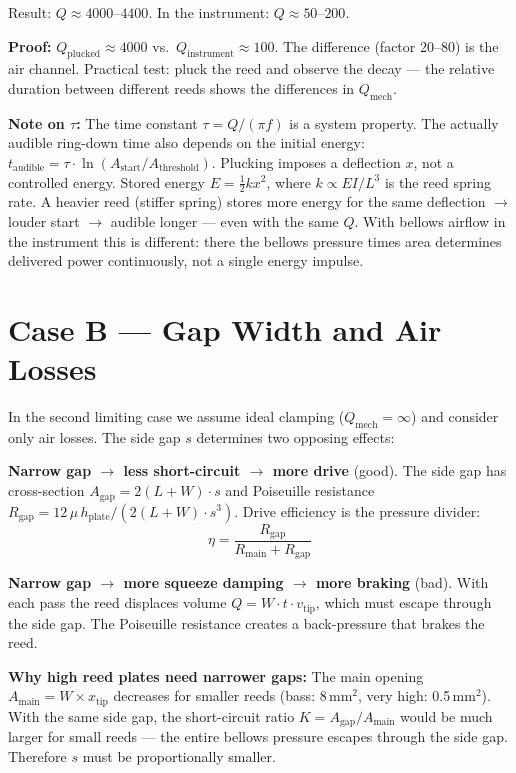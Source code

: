 \documentclass[11pt,a4paper]{article}
\begin{document}
Result: $Q \approx 4000$--$4400$. In the instrument: $Q \approx 50$--$200$.

\begin{keybox}
\textbf{Proof:} $Q_\text{plucked} \approx 4000$ vs.\ $Q_\text{instrument} \approx 100$. The difference (factor 20--80) is the air channel. Practical test: pluck the reed and observe the decay --- the relative duration between different reeds shows the differences in $Q_\text{mech}$.
\end{keybox}

\textbf{Note on $\tau$:} The time constant $\tau = Q/(\pi f)$ is a system property. The actually audible ring-down time also depends on the initial energy: $t_\text{audible} = \tau \cdot \ln(A_\text{start}/A_\text{threshold})$. Plucking imposes a deflection $x$, not a controlled energy. Stored energy $E = \tfrac{1}{2} k x^2$, where $k \propto EI/L^3$ is the reed spring rate. A heavier reed (stiffer spring) stores more energy for the same deflection $\to$ louder start $\to$ audible longer --- even with the same $Q$. With bellows airflow in the instrument this is different: there the bellows pressure times area determines delivered power continuously, not a single energy impulse.

\section{Case B --- Gap Width and Air Losses}

In the second limiting case we assume ideal clamping ($Q_\text{mech} = \infty$) and consider only air losses. The side gap $s$ determines two opposing effects:

\textbf{Narrow gap $\to$ less short-circuit $\to$ more drive} (good). The side gap has cross-section $A_\text{gap} = 2(L+W) \cdot s$ and Poiseuille resistance $R_\text{gap} = 12\,\mu\, h_\text{plate} / (2(L+W) \cdot s^3)$. Drive efficiency is the pressure divider:
\begin{equation}
\eta = \frac{R_\text{gap}}{R_\text{main} + R_\text{gap}}
\end{equation}

\textbf{Narrow gap $\to$ more squeeze damping $\to$ more braking} (bad). With each pass the reed displaces volume $Q = W \cdot t \cdot v_\text{tip}$, which must escape through the side gap. The Poiseuille resistance creates a back-pressure that brakes the reed.

\textbf{Why high reed plates need narrower gaps:} The main opening $A_\text{main} = W \times x_\text{tip}$ decreases for smaller reeds (bass: 8\,mm$^2$, very high: 0.5\,mm$^2$). With the same side gap, the short-circuit ratio $K = A_\text{gap}/A_\text{main}$ would be much larger for small reeds --- the entire bellows pressure escapes through the side gap. Therefore $s$ must be proportionally smaller.
\end{document}
